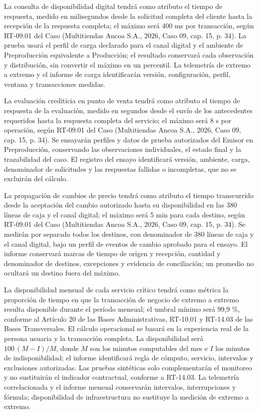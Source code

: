 \documentclass[11pt]{article}
\begin{document}
La consulta de disponibilidad digital tendrá como atributo el tiempo de respuesta, medido en milisegundos desde la solicitud completa del cliente hasta la recepción de la respuesta completa; el máximo será 400 ms por transacción, según RT-09.01 del Caso (Multitiendas Ancoa S.A., 2026, Caso 09, cap. 15, p. 34). La prueba usará el perfil de carga declarado para el canal digital y el ambiente de Preproducción equivalente a Producción; el resultado conservará cada observación y distribución, sin convertir el máximo en un percentil. La telemetría de extremo a extremo y el informe de carga identificarán versión, configuración, perfil, ventana y transacciones medidas.

La evaluación crediticia en punto de venta tendrá como atributo el tiempo de respuesta de la evaluación, medido en segundos desde el envío de los antecedentes requeridos hasta la respuesta completa del servicio; el máximo será 8 s por operación, según RT-09.01 del Caso (Multitiendas Ancoa S.A., 2026, Caso 09, cap. 15, p. 34). Se ensayarán perfiles y datos de prueba autorizados del Emisor en Preproducción, conservando las observaciones individuales, el estado final y la trazabilidad del caso. El registro del ensayo identificará versión, ambiente, carga, denominador de solicitudes y las respuestas fallidas o incompletas, que no se excluirán del cálculo.

La propagación de cambios de precio tendrá como atributo el tiempo transcurrido desde la aceptación del cambio autorizado hasta su disponibilidad en las 380 líneas de caja y el canal digital; el máximo será 5 min para cada destino, según RT-09.01 del Caso (Multitiendas Ancoa S.A., 2026, Caso 09, cap. 15, p. 34). Se medirán por separado todos los destinos, con denominador de 380 líneas de caja y el canal digital, bajo un perfil de eventos de cambio aprobado para el ensayo. El informe conservará marcas de tiempo de origen y recepción, cantidad y denominador de destinos, excepciones y evidencia de conciliación; un promedio no ocultará un destino fuera del máximo.

La disponibilidad mensual de cada servicio crítico tendrá como métrica la proporción de tiempo en que la transacción de negocio de extremo a extremo resulta disponible durante el período mensual; el umbral mínimo será 99,9 \%, conforme al Artículo 20 de las Bases Administrativas, RT-10.01 y RT-14.03 de las Bases Transversales. El cálculo operacional se basará en la experiencia real de la persona usuaria y la transacción completa. La disponibilidad será $100\,(M-I)/M$, donde $M$ son los minutos computables del mes e $I$ los minutos de indisponibilidad; el informe identificará regla de cómputo, servicio, intervalos y exclusiones autorizadas. Las pruebas sintéticas solo complementarán el monitoreo y no sustituirán el indicador contractual, conforme a RT-14.03. La telemetría correlacionada y el informe mensual conservarán intervalos, interrupciones y fórmula; disponibilidad de infraestructura no sustituye la medición de extremo a extremo.
\end{document}
